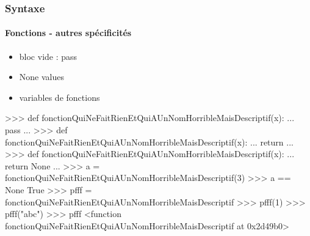 \begin{frame}[fragile]
\frametitle{Syntaxe}
\framesubtitle{Fonctions - autres spécificités}
\begin{itemize}
\item bloc vide : pass 
\item None values
\item variables de fonctions 
\end{itemize}
\begin{pythonConsole}
>>> def fonctionQuiNeFaitRienEtQuiAUnNomHorribleMaisDescriptif(x): 
...    pass
...
>>> def fonctionQuiNeFaitRienEtQuiAUnNomHorribleMaisDescriptif(x): 
...    return
...
>>> def fonctionQuiNeFaitRienEtQuiAUnNomHorribleMaisDescriptif(x): 
...    return None
...
>>> a = fonctionQuiNeFaitRienEtQuiAUnNomHorribleMaisDescriptif(3)
>>> a == None
True
>>> pfff = fonctionQuiNeFaitRienEtQuiAUnNomHorribleMaisDescriptif
>>> pfff(1)
>>> pfff("abc")
>>> pfff
<function fonctionQuiNeFaitRienEtQuiAUnNomHorribleMaisDescriptif at 0x2d49b0>
\end{pythonConsole}
\end{frame}
